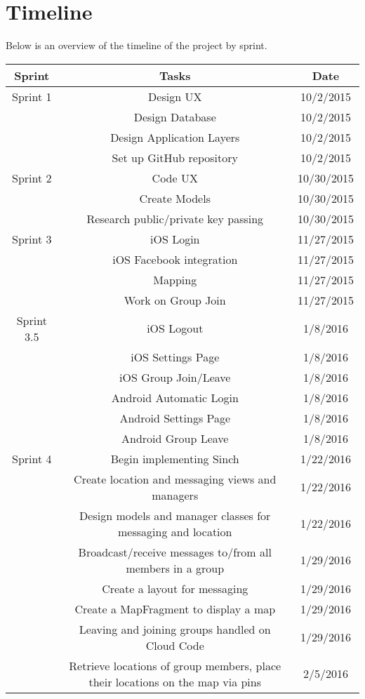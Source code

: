 \section{Timeline}
Below is an overview of the timeline of the project by sprint.
\begin{center}
	\begin{tabular}{c|c|c}
	Sprint & Tasks & Date\\
	\hline
	Sprint 1 &  Design UX & 10/2/2015\\
	& Design Database& 10/2/2015\\
	& Design Application Layers & 10/2/2015\\
	& Set up GitHub repository & 10/2/2015\\
	\hline
	Sprint 2 & Code UX & 10/30/2015 \\
	& Create Models & 10/30/2015\\
	& Research public/private key passing & 10/30/2015\\
	\hline
	Sprint 3 & iOS Login & 11/27/2015\\
	& iOS Facebook integration & 11/27/2015\\
	& Mapping & 11/27/2015\\
	& Work on Group Join & 11/27/2015\\
	\hline
	Sprint 3.5 & iOS Logout & 1/8/2016\\
	& iOS Settings Page & 1/8/2016\\
	& iOS Group Join/Leave & 1/8/2016\\
	& Android Automatic Login & 1/8/2016\\
	& Android Settings Page & 1/8/2016\\
	& Android Group Leave & 1/8/2016\\
	\hline
	Sprint 4& Begin implementing Sinch & 1/22/2016\\
	& Create location and messaging views and managers & 1/22/2016\\
	& Design models and manager classes for messaging and location  & 1/22/2016\\
	& Broadcast/receive messages to/from all members in a group & 1/29/2016 \\
	& Create a layout for messaging & 1/29/2016 \\
	& Create a MapFragment to display a map & 1/29/2016 \\
	& Leaving and joining groups handled on Cloud Code & 1/29/2016 \\
	& Retrieve locations of group members, place their locations on the map via pins & 2/5/2016\\

\end{tabular}
\end{center}
